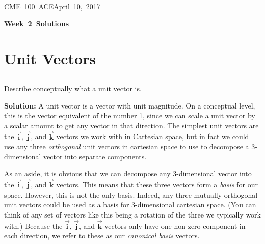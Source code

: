 \documentclass[letterpaper, 10pt]{article}
\makeatletter
\newcommand{\hmwkTitle}{Week\ 2\ Solutions} %
\newcommand{\hmwkClass}{CME\ 100\ ACE} %
\newcommand{\hmwkAuthorName}{Timothy Anderson} %
\newcommand{\hmwkAuthorEmail}{timmya@stanford.edu} %
\makeatother
\begin{document}


\noindent
\normalsize 
\hmwkClass \hfill April\ 10,\ 2017\\

\begin{center} \Large \textbf{\hmwkTitle} \end{center}


\section{Unit Vectors}
\subsection{} Describe conceptually what a unit vector is. 
\par \textbf{Solution:} A unit vector is a vector with unit magnitude. On a conceptual level, this is the vector equivalent of the number 1, since we can scale a unit vector by a scalar amount to get any vector in that direction. The simplest unit vectors are the $\bm{\vec i}$, $\bm{\vec j}$, and $\bm{\vec k}$ vectors we work with in Cartesian space, but in fact we could use any three \textit{orthogonal} unit vectors in cartesian space to use to decompose a 3-dimensional vector into separate components. 
\par As an aside, it is obvious that we can decompose any 3-dimensional vector into the $\bm{\vec i}$, $\bm{\vec j}$, and $\bm{\vec k}$ vectors. This means that these three vectors form a \textit{basis} for our space. However, this is not the only basis. Indeed, any three mutually orthogonal unit vectors could be used as a basis for 3-dimensional cartesian space. (You can think of any set of vectors like this being a rotation of the three we typically work with.) Because the $\bm{\vec i}$, $\bm{\vec j}$, and $\bm{\vec k}$ vectors only have one non-zero component in each direction, we refer to these as our \textit{canonical basis} vectors. 
\end{document}
